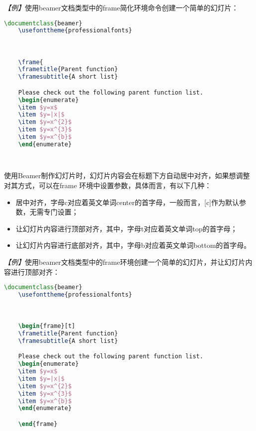 \emph{【例】}使用beamer文档类型中的frame简化环境命令创建一个简单的幻灯片：
\begin{lstlisting}[language=TeX]
    \documentclass{beamer}
    \usefonttheme{professionalfonts}

    

    \frame{
    \frametitle{Parent function}
    \framesubtitle{A short list}

    Please check out the following parent function list.
    \begin{enumerate}
    \item $y=x$
    \item $y=|x|$
    \item $y=x^{2}$
    \item $y=x^{3}$
    \item $y=x^{b}$
    \end{enumerate}

    
\end{lstlisting}

使用Beamer制作幻灯片时，幻灯片内容会在标题下方自动居中对齐，如果想调整对其方式，可以在frame
环境中设置参数，具体而言，有以下几种：
\begin{itemize}
    \item [c] 居中对齐，字母c对应着英文单词center的首字母，一般而言，[c]作为默认参数，无需专门设置；
    \item [t] 让幻灯片内容进行顶部对齐，其中，字母t对应着英文单词top的首字母；
    \item [b] 让幻灯片内容进行底部对齐，其中，字母b对应着英文单词bottom的首字母。
\end{itemize}

\emph{【例】}使用beamer文档类型中的frame环境创建一个简单的幻灯片，并让幻灯片内容进行顶部对齐：
\begin{lstlisting}[language=TeX]
    \documentclass{beamer}
    \usefonttheme{professionalfonts}

    

    \begin{frame}[t]
    \frametitle{Parent function}
    \framesubtitle{A short list}

    Please check out the following parent function list.
    \begin{enumerate}
    \item $y=x$
    \item $y=|x|$
    \item $y=x^{2}$
    \item $y=x^{3}$
    \item $y=x^{b}$
    \end{enumerate}

    \end{frame}

    
\end{lstlisting}

